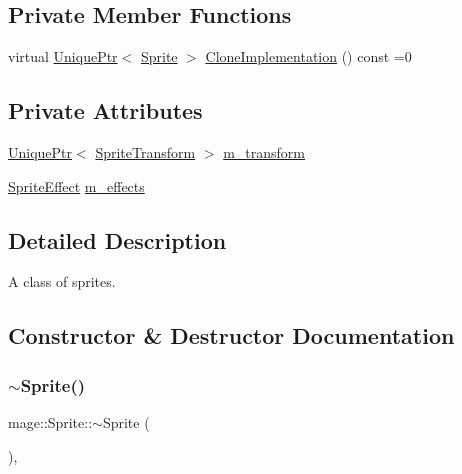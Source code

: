 \subsection*{Private Member Functions}
\begin{DoxyCompactItemize}
\item 
virtual \hyperlink{namespacemage_a3316d7143a973e37adf1110f2e80ca31}{Unique\+Ptr}$<$ \hyperlink{classmage_1_1_sprite}{Sprite} $>$ \hyperlink{classmage_1_1_sprite_a214890d7da493bccadb2327b8c7ffb09}{Clone\+Implementation} () const =0
\end{DoxyCompactItemize}
\subsection*{Private Attributes}
\begin{DoxyCompactItemize}
\item 
\hyperlink{namespacemage_a3316d7143a973e37adf1110f2e80ca31}{Unique\+Ptr}$<$ \hyperlink{classmage_1_1_sprite_transform}{Sprite\+Transform} $>$ \hyperlink{classmage_1_1_sprite_ae9907dd9d43fe2ce025bbc86b06dc7a3}{m\+\_\+transform}
\item 
\hyperlink{namespacemage_a9cfe18123066ba4236f548f9de75d881}{Sprite\+Effect} \hyperlink{classmage_1_1_sprite_a87a51b2b131c28bad75768d14defa3c1}{m\+\_\+effects}
\end{DoxyCompactItemize}


\subsection{Detailed Description}
A class of sprites. 

\subsection{Constructor \& Destructor Documentation}
\hypertarget{classmage_1_1_sprite_a0f184574f9c035d6fbb239c1868aa670}{}\label{classmage_1_1_sprite_a0f184574f9c035d6fbb239c1868aa670} 
\subsubsection{\texorpdfstring{$\sim$\+Sprite()}{~Sprite()}}
{\footnotesize\ttfamily mage\+::\+Sprite\+::$\sim$\+Sprite (\begin{DoxyParamCaption}{ }\end{DoxyParamCaption})\hspace{0.3cm}{\ttfamily [virtual]}, {\ttfamily [default]}}

